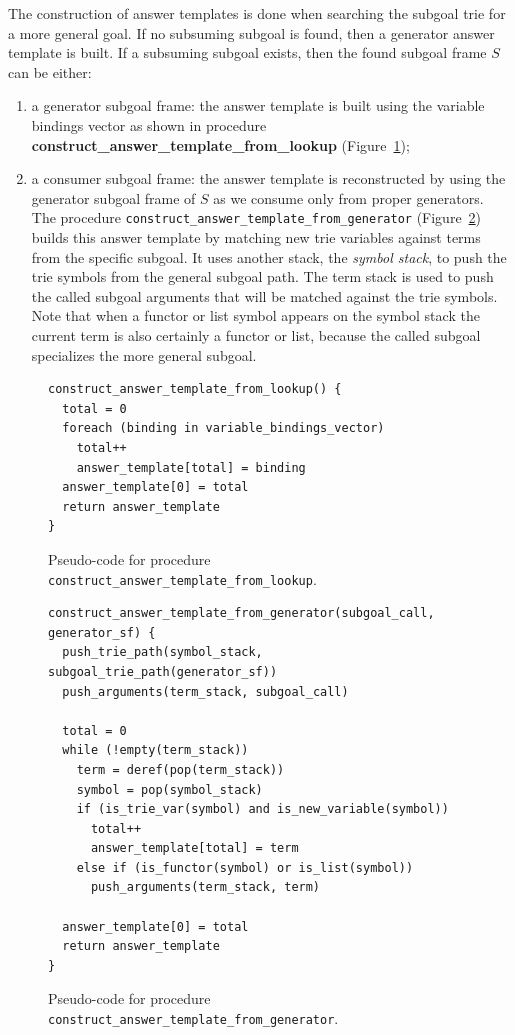 The construction of answer templates is done when searching the subgoal trie for a more general goal.
If no subsuming subgoal is found, then a generator answer template is built. If a subsuming subgoal
exists, then the found subgoal frame $S$ can be either:

\begin{enumerate}
  \item a generator subgoal frame: the answer template is built using
  the variable bindings vector as shown in procedure \textbf{construct\_answer\_template\_from\_lookup}
  (Figure~\ref{fig:construct_answer_template_from_lookup});
  
  \item a consumer subgoal frame: the answer template is reconstructed by using the generator
  subgoal frame of $S$ as we consume only from proper generators. 
  The procedure \texttt{construct\_answer\_template\_from\_generator}
  (Figure~\ref{fig:construct_answer_template_from_generator}) builds this answer template by
  matching new trie variables against terms from the specific subgoal. It
  uses another stack, the \textit{symbol stack}, to push the trie
  symbols from the general subgoal path. The term stack is used to push the called subgoal arguments that
  will be matched against the trie symbols. Note that when a functor or list symbol appears
  on the symbol stack the current term is also certainly a functor or list, because the called subgoal
  specializes the more general subgoal.
\end{enumerate}

\begin{figure}[ht]
\begin{Verbatim}
construct_answer_template_from_lookup() {
  total = 0
  foreach (binding in variable_bindings_vector)
    total++
    answer_template[total] = binding
  answer_template[0] = total
  return answer_template
}
\end{Verbatim}
\caption{Pseudo-code for procedure \texttt{construct\_answer\_template\_from\_lookup}.}
\label{fig:construct_answer_template_from_lookup}
\end{figure}

\begin{figure}[ht]
\begin{Verbatim}
construct_answer_template_from_generator(subgoal_call, generator_sf) {
  push_trie_path(symbol_stack, subgoal_trie_path(generator_sf))
  push_arguments(term_stack, subgoal_call)
  
  total = 0
  while (!empty(term_stack))
    term = deref(pop(term_stack))
    symbol = pop(symbol_stack)
    if (is_trie_var(symbol) and is_new_variable(symbol))
      total++
      answer_template[total] = term
    else if (is_functor(symbol) or is_list(symbol))
      push_arguments(term_stack, term)
  
  answer_template[0] = total
  return answer_template
}
\end{Verbatim}
\caption{Pseudo-code for procedure \texttt{construct\_answer\_template\_from\_generator}.}
\label{fig:construct_answer_template_from_generator}
\end{figure}

